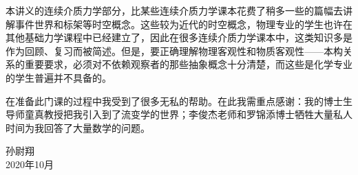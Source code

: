 \documentclass[main.tex]{subfiles}
\begin{document}
本讲义的连续介质力学部分，比某些连续介质力学课本花费了稍多一些的篇幅去讲解事件世界和标架等时空概念。这些较为近代的时空概念，物理专业的学生也许在其他基础力学课程中已经建立了，因此在很多连续介质力学课本中，这类知识多是作为回顾、复习而被简述。但是，要正确理解物理客观性和物质客观性——本构关系的重要要求，必须对不依赖观察者的那些抽象概念十分清楚，而这些是化学专业的学生普遍并不具备的。

在准备此门课的过程中我受到了很多无私的帮助。在此我需重点感谢：我的博士生导师童真教授把我引入到了流变学的世界；李俊杰老师和罗锦添博士牺牲大量私人时间为我回答了大量数学的问题。

\begin{flushright}
孙尉翔\\
2020年10月
\end{flushright}
\end{document}
